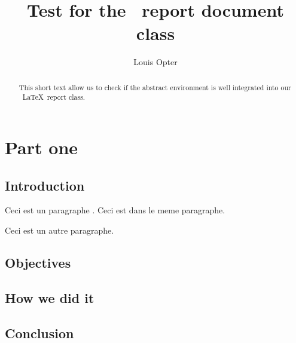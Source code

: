 \documentclass{rtxreport}
\author{Louis Opter}
\title{Test for the \rtx\ report document class}
\begin{document}
\maketitle

\begin{abstract}
This short text allow us to check if the abstract environment is well
integrated into our \rtx\ \LaTeX\ report class.
\end{abstract}

\rtxmaketitleblock

\tableofcontents

\chapter{Part one}

\section{Introduction}

\lipsum[1]

Ceci est un paragraphe \cite{GPL3}.
Ceci est dans le meme paragraphe.

Ceci est un autre paragraphe.

\section{Objectives}

\lipsum[2]

\section{How we did it}

\lipsum[3]

\section{Conclusion}

\lipsum[4]

\rtxbibliography
\end{document}
